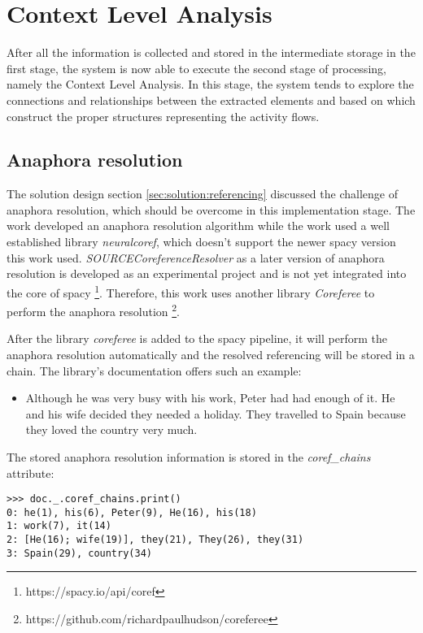 \section{Context Level Analysis}
After all the information is collected and stored in the intermediate storage in the first stage, the system is now able to execute the second stage of processing, namely the Context Level Analysis. In this stage, the system tends to explore the connections and relationships between the extracted elements and based on which construct the proper structures representing the activity flows.

\subsection{Anaphora resolution}
The solution design section \ref{sec:solution:referencing} discussed the challenge of anaphora resolution, which should be overcome in this implementation stage. The work \cite{t2m_1_main} developed an anaphora resolution algorithm while the work \cite{t2m_1_successor} used a well established library \textit{neuralcoref}, which doesn't support the newer spacy version this work used. \textit{SOURCECoreferenceResolver} as a later version of anaphora resolution is developed as an experimental project and is not yet integrated into the core of spacy \footnote{https://spacy.io/api/coref}. Therefore, this work uses another library \textit{Coreferee} to perform the anaphora resolution \footnote{https://github.com/richardpaulhudson/coreferee}.

After the library \textit{coreferee} is added to the spacy pipeline, it will perform the anaphora resolution automatically and the resolved referencing will be stored in a chain. The library's documentation offers such an example:

\begin{itemize}
    \item Although he was very busy with his work, Peter had had enough of it. He and his wife decided they needed a holiday. They travelled to Spain because they loved the country very much.
\end{itemize}

The stored anaphora resolution information is stored in the \textit{coref\_chains} attribute:
 
\begin{lstlisting}
>>> doc._.coref_chains.print()
0: he(1), his(6), Peter(9), He(16), his(18)
1: work(7), it(14)
2: [He(16); wife(19)], they(21), They(26), they(31)
3: Spain(29), country(34)	
\end{lstlisting}


